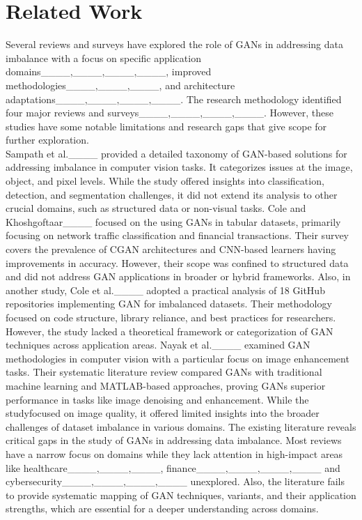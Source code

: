 \section{Related Work}
Several reviews and surveys have explored the role of GANs in addressing data imbalance with a focus on specific application domains____,____,____,____, improved methodologies____,____,____, and architecture adaptations____,____,____,____. The research methodology identified four major reviews and surveys____,____,____,____. However, these studies have some notable limitations and research gaps that give scope for further exploration.\\
Sampath et al.____ provided a detailed taxonomy of GAN-based solutions for addressing imbalance in computer vision tasks. It categorizes issues at the image, object, and pixel levels. While the study offered insights into classification, detection, and segmentation challenges, it did not extend its analysis to other crucial domains, such as structured data or non-visual tasks. 
Cole and Khoshgoftaar____ focused on the using GANs in tabular datasets, primarily focusing on network traffic classification and financial transactions. Their survey covers the prevalence of CGAN architectures and CNN-based learners having improvements in accuracy. However, their scope was confined to structured data and did not address GAN applications in broader or hybrid frameworks. 
Also, in another study, Cole et al.____ adopted a practical analysis of 18 GitHub repositories implementing GAN for imbalanced datasets. Their methodology focused on code structure, library reliance, and best practices for researchers. However, the study lacked a theoretical framework or categorization of GAN techniques across application areas.   
Nayak et al.____ examined GAN methodologies in computer vision with a particular focus on image enhancement tasks. Their systematic literature review compared GANs with traditional machine learning and MATLAB-based approaches, proving GANs superior performance in tasks like image denoising and enhancement. While the studyfocused on image quality, it offered limited insights into the broader challenges of dataset imbalance in various domains.
The existing literature reveals critical gaps in the study of GANs in addressing data imbalance. Most reviews have a narrow focus on domains while they lack attention in high-impact areas like healthcare____,____,____, finance____,____,____,____ and cybersecurity____,____,____,____ unexplored. Also, the literature fails to provide systematic mapping of GAN techniques, variants, and their application strengths, which are essential for a deeper understanding across domains.

